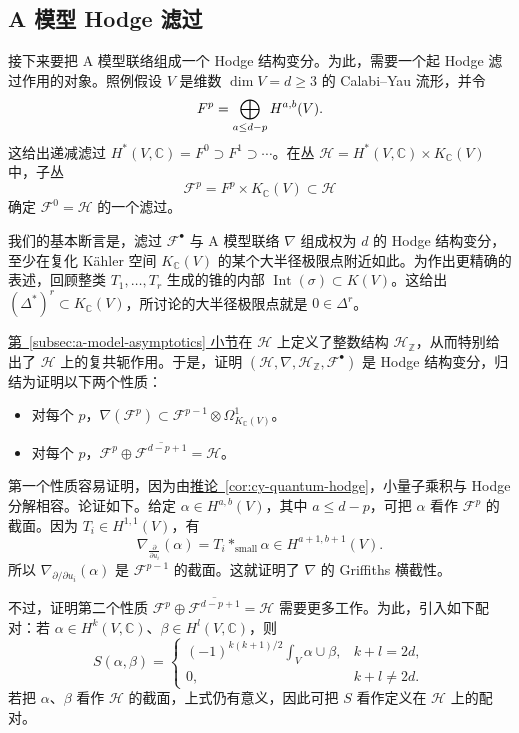\subsection{A 模型 Hodge 滤过}\label{subsec:a-model-hodge-filtration}
接下来要把 A 模型联络组成一个 Hodge 结构变分。为此，需要一个起 Hodge 滤过作用的对象。照例假设 $V$ 是维数 $\dim V=d\ge3$ 的 Calabi--Yau 流形，并令
\begin{equation}\label{eq:a-model-hodge-filtration}\index{Hodge 滤过!A 模型|hyperpage}
F^p=\bigoplus_{a\le d-p}H^{a,b}(V).
\end{equation}
这给出递减滤过 $H^*(V,\mathbb C)=F^0\supset F^1\supset\cdots$。在丛 $\mathcal H=H^*(V,\mathbb C)\times K_{\mathbb C}(V)$ 中，子丛
\[
\mathcal F^p=F^p\times K_{\mathbb C}(V)\subset\mathcal H
\]
确定 $\mathcal F^0=\mathcal H$ 的一个滤过。

我们的基本断言是，滤过 $\mathcal F^\bullet$ 与 A 模型联络 $\nabla$ 组成权为 $d$ 的 Hodge 结构变分，至少在复化 Kähler 空间 $K_{\mathbb C}(V)$ 的某个大半径极限点附近如此。为作出更精确的表述，回顾整类 $T_1,\ldots,T_r$ 生成的锥的内部 $\operatorname{Int}(\sigma)\subset K(V)$。这给出 $(\Delta^*)^r\subset K_{\mathbb C}(V)$，所讨论的大半径极限点就是 $0\in\Delta^r$。

\hyperref[subsec:a-model-asymptotics]{第~\ref*{subsec:a-model-asymptotics} 小节}在 $\mathcal H$ 上定义了整数结构 $\mathcal H_{\mathbb Z}$，从而特别给出了 $\mathcal H$ 上的复共轭作用。于是，证明 $(\mathcal H,\nabla,\mathcal H_{\mathbb Z},\mathcal F^\bullet)$ 是 Hodge 结构变分，归结为证明以下两个性质：
\begin{itemize}
\item 对每个 $p$，$\nabla(\mathcal F^p)\subset\mathcal F^{p-1}\otimes\Omega^1_{K_{\mathbb C}(V)}$。
\item 对每个 $p$，$\mathcal F^p\oplus\overline{\mathcal F^{d-p+1}}=\mathcal H$。
\end{itemize}
第一个性质容易证明，因为由\hyperref[cor:cy-quantum-hodge]{推论~\ref*{cor:cy-quantum-hodge}}，小量子乘积与 Hodge 分解相容。论证如下。给定 $\alpha\in H^{a,b}(V)$，其中 $a\le d-p$，可把 $\alpha$ 看作 $\mathcal F^p$ 的截面。因为 $T_i\in H^{1,1}(V)$，有
\[
\nabla_{\frac{\partial}{\partial u_i}}(\alpha)=T_i*_{\mathrm{small}}\alpha\in H^{a+1,b+1}(V).
\]
所以 $\nabla_{\partial/\partial u_i}(\alpha)$ 是 $\mathcal F^{p-1}$ 的截面。这就证明了 $\nabla$ 的 Griffiths 横截性。

不过，证明第二个性质 $\mathcal F^p\oplus\overline{\mathcal F^{d-p+1}}=\mathcal H$ 需要更多工作。为此，引入如下配对：若 $\alpha\in H^k(V,\mathbb C)$、$\beta\in H^l(V,\mathbb C)$，则
\begin{equation}\label{eq:a-model-polarizing-form}
S(\alpha,\beta)=\begin{cases}
(-1)^{k(k+1)/2}\displaystyle\int_V\alpha\cup\beta,&k+l=2d,\\
0,&k+l\ne2d.
\end{cases}
\end{equation}
若把 $\alpha$、$\beta$ 看作 $\mathcal H$ 的截面，上式仍有意义，因此可把 $S$ 看作定义在 $\mathcal H$ 上的配对。

